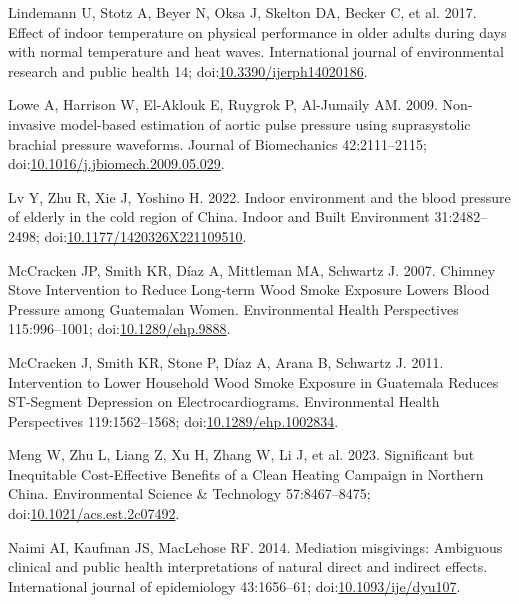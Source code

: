 \documentclass[
  letterpaper,
  DIV=11,
  numbers=noendperiod]{scrartcl}
\newlength{\cslhangindent}
\newlength{\cslentryspacingunit} %
\newenvironment{CSLReferences}[2] %
 {%
  \setlength{\parindent}{0pt}
  \ifodd #1
  \let\oldpar\par
  \def\par{\hangindent=\cslhangindent\oldpar}
  \fi
  \setlength{\parskip}{#2\cslentryspacingunit}
 }%
 {}
\begin{document}
\begin{CSLReferences}{1}{0}
\leavevmode{}%
Lindemann U, Stotz A, Beyer N, Oksa J, Skelton DA, Becker C, et al.
2017. Effect of indoor temperature on physical performance in older
adults during days with normal temperature and heat waves. International
journal of environmental research and public health 14;
doi:\href{https://doi.org/10.3390/ijerph14020186}{10.3390/ijerph14020186}.

\leavevmode{}%
Lowe A, Harrison W, El-Aklouk E, Ruygrok P, Al-Jumaily AM. 2009.
Non-invasive model-based estimation of aortic pulse pressure using
suprasystolic brachial pressure waveforms. Journal of Biomechanics
42:2111--2115;
doi:\href{https://doi.org/10.1016/j.jbiomech.2009.05.029}{10.1016/j.jbiomech.2009.05.029}.

\leavevmode{}%
Lv Y, Zhu R, Xie J, Yoshino H. 2022. Indoor environment and the blood
pressure of elderly in the cold region of {China}. Indoor and Built
Environment 31:2482--2498;
doi:\href{https://doi.org/10.1177/1420326X221109510}{10.1177/1420326X221109510}.

\leavevmode{}%
McCracken JP, Smith KR, Díaz A, Mittleman MA, Schwartz J. 2007. Chimney
{Stove Intervention} to {Reduce Long-term Wood Smoke Exposure Lowers
Blood Pressure} among {Guatemalan Women}. Environmental Health
Perspectives 115:996--1001;
doi:\href{https://doi.org/10.1289/ehp.9888}{10.1289/ehp.9888}.

\leavevmode{}%
McCracken J, Smith KR, Stone P, Díaz A, Arana B, Schwartz J. 2011.
Intervention to {Lower Household Wood Smoke Exposure} in {Guatemala
Reduces ST-Segment Depression} on {Electrocardiograms}. Environmental
Health Perspectives 119:1562--1568;
doi:\href{https://doi.org/10.1289/ehp.1002834}{10.1289/ehp.1002834}.

\leavevmode{}%
Meng W, Zhu L, Liang Z, Xu H, Zhang W, Li J, et al. 2023. Significant
but {Inequitable Cost-Effective Benefits} of a {Clean Heating Campaign}
in {Northern China}. Environmental Science \& Technology 57:8467--8475;
doi:\href{https://doi.org/10.1021/acs.est.2c07492}{10.1021/acs.est.2c07492}.

\leavevmode{}%
Naimi AI, Kaufman JS, MacLehose RF. 2014. Mediation misgivings:
Ambiguous clinical and public health interpretations of natural direct
and indirect effects. International journal of epidemiology 43:1656--61;
doi:\href{https://doi.org/10.1093/ije/dyu107}{10.1093/ije/dyu107}.


\end{CSLReferences}
\end{document}
